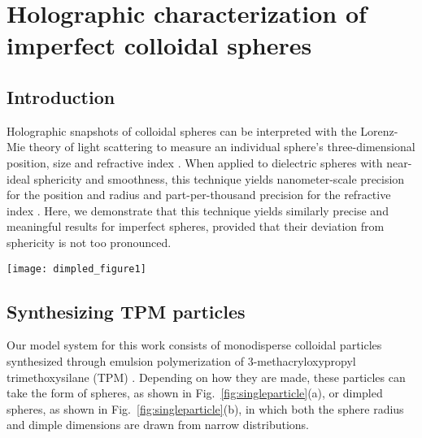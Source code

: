\chapter{Holographic characterization of imperfect colloidal spheres}
\label{ch:dimpled}

\section{Introduction}

Holographic snapshots of colloidal spheres can be interpreted
with the Lorenz-Mie theory of light scattering to measure
an individual sphere's three-dimensional position,
size and refractive index \cite{lee07a}.
When applied to dielectric spheres with near-ideal sphericity
and smoothness, this technique yields nanometer-scale
precision for the position and radius 
\cite{lee07a,cheong10a,moyses13,krishnatreya14} 
and part-per-thousand precision for the refractive index 
\cite{lee07a,shpaisman12}.
Here, we demonstrate that this technique yields similarly precise 
and meaningful results for imperfect spheres, provided that their
deviation from sphericity is not too pronounced.

\begin{figure*}[t]
  \centering
  \texttt{[image: dimpled\_figure1]}
  \caption{(a) Scanning electron micrograph of a colloidal TPM sphere and 
    (b) a dimpled sphere.  Scale bars represent \SI{500}{\nm}.
    (c) and (d) Corresponding holograms for
    particles from the samples show in (a) and (b).  (e) \num{5000} measurements
    of sphere radius and refractive index for a single
    TPM sphere held in an optical tweezer.  Each point represents
    a single measurement, and is colored according to the
    relative density of measurements, $P(a_p,n_p)$.  (f) equivalent result for
    a dimpled sphere.  (g) \num{5000} measurements of the radius and
    refractive index of a freely diffusing sphere.  (h) Equivalent
    result for a dimpled sphere.
   }
  \label{fig:singleparticle}
\end{figure*}

\section{Synthesizing TPM particles}

Our model system for this work consists of monodisperse
colloidal particles synthesized through emulsion polymerization of
3-methacryloxypropyl trimethoxysilane (TPM) \cite{sacanna13}.
Depending on how they are made, these particles can take the form
of spheres, as shown in Fig.~\ref{fig:singleparticle}(a), or dimpled
spheres, as shown in Fig.~\ref{fig:singleparticle}(b), in which both
the sphere radius and dimple dimensions are drawn from narrow
distributions.

